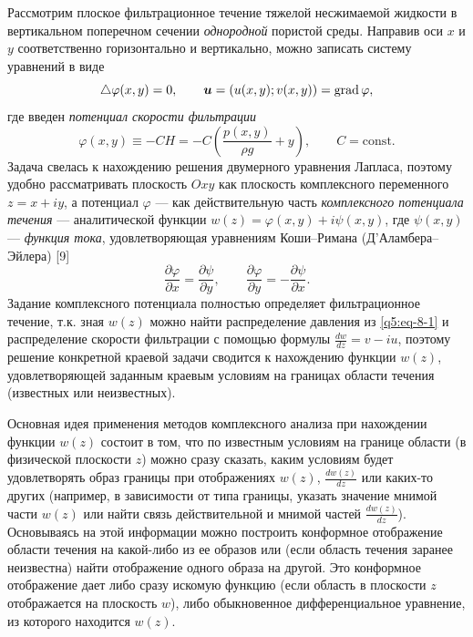 Рассмотрим плоское фильтрационное течение тяжелой несжимаемой жидкости в вертикальном поперечном сечении \textit{однородной} пористой среды. Направив оси $x$ и $y$ соответственно горизонтально и вертикально, можно записать систему уравнений в виде
\[
\triangle\varphi(x,y)=0,\qquad \boldsymbol{u}=(u(x,y);v(x,y))=\operatorname{grad}\varphi,
\]
где введен \textit{потенциал скорости фильтрации}
\begin{equation}
\varphi(x,y)\equiv-CH=-C\left(\frac{p(x,y)}{\rho g}+y\right),\qquad C=\mathrm{const}.
\tag{8.1}\label{q5:eq-8-1}
\end{equation}
Задача свелась к нахождению решения двумерного уравнения Лапласа, поэтому удобно рассматривать плоскость $Oxy$ как плоскость комплексного переменного $z=x+iy$, а потенциал $\varphi$ --- как действительную часть \textit{комплексного потенциала течения} --- аналитической функции $w(z)=\varphi(x,y)+i\psi(x,y)$, где $\psi(x,y)$ --- \textit{функция тока}, удовлетворяющая уравнениям Коши--Римана (Д’Аламбера--Эйлера) [9]
\[
\frac{\partial\varphi}{\partial x}=\frac{\partial\psi}{\partial y},\qquad
\frac{\partial\varphi}{\partial y}=-\frac{\partial\psi}{\partial x}.
\]
Задание комплексного потенциала полностью определяет фильтрационное течение, т.к. зная $w(z)$ можно найти распределение давления из \eqref{q5:eq-8-1} и распределение скорости фильтрации с помощью формулы $\frac{dw}{dz}=v-iu$, поэтому решение конкретной краевой задачи сводится к нахождению функции $w(z)$, удовлетворяющей заданным краевым условиям на границах области течения (известных или неизвестных).

Основная идея применения методов комплексного анализа при нахождении функции $w(z)$ состоит в том, что по известным условиям на границе области (в физической плоскости $z$) можно сразу сказать, каким условиям будет удовлетворять образ границы при отображениях $w(z)$, $\frac{dw(z)}{dz}$ или каких-то других (например, в зависимости от типа границы, указать значение мнимой части $w(z)$ или найти связь действительной и мнимой частей $\frac{dw(z)}{dz}$). Основываясь на этой информации можно построить конформное отображение области течения на какой-либо из ее образов или (если
область течения заранее неизвестна) найти отображение одного образа на другой. Это конформное отображение дает либо сразу искомую функцию (если область в плоскости $z$ отображается на плоскость $w$), либо обыкновенное дифференциальное уравнение, из которого находится $w(z)$.


